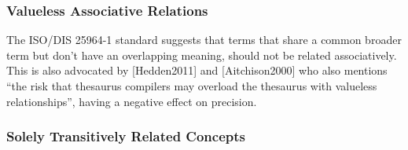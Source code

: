  


\subsubsection{Valueless Associative Relations}
The ISO/DIS 25964-1 standard suggests that terms that share a common broader term but don’t have an overlapping meaning, should not be related associatively. This is also advocated by [Hedden2011] and [Aitchison2000] who also mentions “the risk that thesaurus compilers may overload the thesaurus with valueless relationships”, having a negative effect on precision. 

\subsubsection{Solely Transitively Related Concepts}



